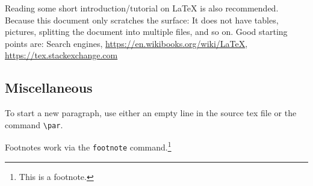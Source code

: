 \documentclass[11pt]{scrartcl}
\begin{document}
Reading some short introduction/tutorial on \LaTeX{} is also recommended.
Because this document only scratches the surface:
It does not have tables, pictures, splitting the document into multiple files, and so on.
Good starting points are:
Search engines, \url{https://en.wikibooks.org/wiki/LaTeX}, \url{https://tex.stackexchange.com}



\subsection{Miscellaneous}
\label{subsec:misc}

To start a new paragraph, use either an empty line in the source tex file or the command \verb|\par|.

Footnotes work via the \verb|footnote| command.\footnote{This is a footnote.}


\printbibliography{}
\end{document}
